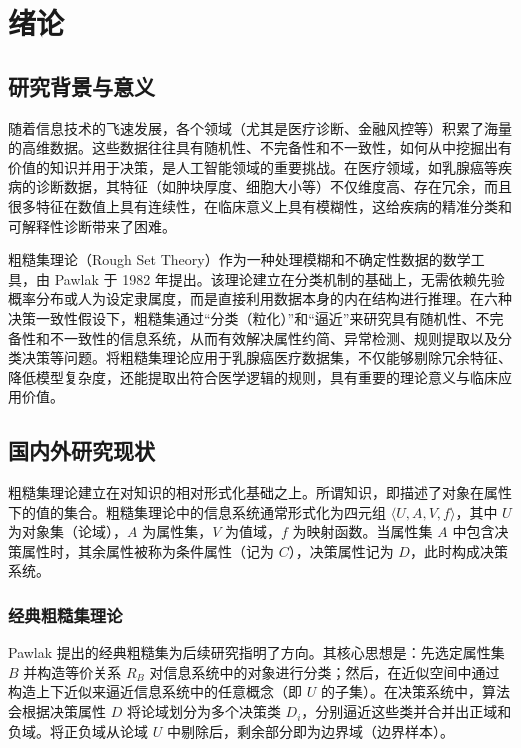 
\chapter{绪论}

\section{研究背景与意义}

随着信息技术的飞速发展，各个领域（尤其是医疗诊断、金融风控等）积累了海量的高维数据。这些数据往往具有随机性、不完备性和不一致性，如何从中挖掘出有价值的知识并用于决策，是人工智能领域的重要挑战。在医疗领域，如乳腺癌等疾病的诊断数据，其特征（如肿块厚度、细胞大小等）不仅维度高、存在冗余，而且很多特征在数值上具有连续性，在临床意义上具有模糊性，这给疾病的精准分类和可解释性诊断带来了困难。

粗糙集理论（Rough Set Theory）作为一种处理模糊和不确定性数据的数学工具，由 Pawlak 于 1982 年提出。该理论建立在分类机制的基础上，无需依赖先验概率分布或人为设定隶属度，而是直接利用数据本身的内在结构进行推理。在六种决策一致性假设下，粗糙集通过“分类（粒化）”和“逼近”来研究具有随机性、不完备性和不一致性的信息系统，从而有效解决属性约简、异常检测、规则提取以及分类决策等问题。将粗糙集理论应用于乳腺癌医疗数据集，不仅能够剔除冗余特征、降低模型复杂度，还能提取出符合医学逻辑的规则，具有重要的理论意义与临床应用价值。

\section{国内外研究现状}

粗糙集理论建立在对知识的相对形式化基础之上。所谓知识，即描述了对象在属性下的值的集合。粗糙集理论中的信息系统通常形式化为四元组 \(\langle U, A, V, f \rangle\)，其中 \(U\) 为对象集（论域），\(A\) 为属性集，\(V\) 为值域，\(f\) 为映射函数。当属性集 \(A\) 中包含决策属性时，其余属性被称为条件属性（记为 \(C\)），决策属性记为 \(D\)，此时构成决策系统。

\subsection{经典粗糙集理论}
Pawlak 提出的经典粗糙集为后续研究指明了方向。其核心思想是：先选定属性集 \(B\) 并构造等价关系 \(R_B\) 对信息系统中的对象进行分类；然后，在近似空间中通过构造上下近似来逼近信息系统中的任意概念（即 \(U\) 的子集）。在决策系统中，算法会根据决策属性 \(D\) 将论域划分为多个决策类 \(D_i\)，分别逼近这些类并合并出正域和负域。将正负域从论域 \(U\) 中剔除后，剩余部分即为边界域（边界样本）。

